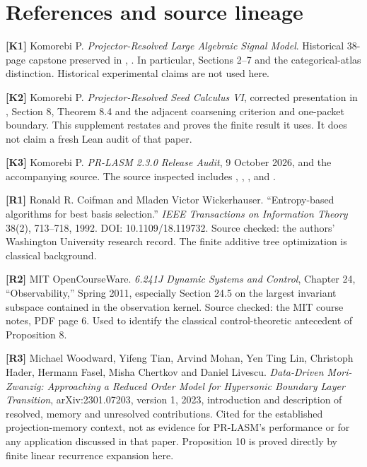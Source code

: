 \documentclass[11pt,letterpaper]{article}
\begin{document}
\newpage

\begingroup
\small\raggedright

\section{References and source
lineage}\label{references-and-source-lineage}

\textbf{{[}K1{]}} Komorebi P. \emph{Projector-Resolved Large Algebraic
Signal Model}. Historical 38-page capstone preserved in
,
.
In particular, Sections 2--7 and the categorical-atlas distinction.
Historical experimental claims are not used here.

\textbf{{[}K2{]}} Komorebi P. \emph{Projector-Resolved Seed Calculus
VI}, corrected presentation in
, Section 8, Theorem 8.4
and the adjacent coarsening criterion and one-packet boundary. This
supplement restates and proves the finite result it uses. It does not
claim a fresh Lean audit of that paper.

\textbf{{[}K3{]}} Komorebi P. \emph{PR-LASM 2.3.0 Release Audit}, 9
October 2026, and the accompanying source. The source inspected includes
, ,
,  and
.

\textbf{{[}R1{]}} Ronald R. Coifman and Mladen Victor Wickerhauser.
``Entropy-based algorithms for best basis selection.'' \emph{IEEE
Transactions on Information Theory} 38(2), 713--718, 1992. DOI:
10.1109/18.119732. Source checked: the authors' Washington University
research record. The finite additive tree optimization is classical
background.

\textbf{{[}R2{]}} MIT OpenCourseWare. \emph{6.241J Dynamic Systems and
Control}, Chapter 24, ``Observability,'' Spring 2011, especially Section
24.5 on the largest invariant subspace contained in the observation
kernel. Source checked: the MIT course notes, PDF page 6. Used to
identify the classical control-theoretic antecedent of Proposition 8.

\textbf{{[}R3{]}} Michael Woodward, Yifeng Tian, Arvind Mohan, Yen Ting
Lin, Christoph Hader, Hermann Fasel, Misha Chertkov and Daniel Livescu.
\emph{Data-Driven Mori-Zwanzig: Approaching a Reduced Order Model for
Hypersonic Boundary Layer Transition}, arXiv:2301.07203, version 1,
2023, introduction and description of resolved, memory and unresolved
contributions. Cited for the established projection-memory context, not
as evidence for PR-LASM's performance or for any application discussed
in that paper. Proposition 10 is proved directly by finite linear
recurrence expansion here.
\end{document}
